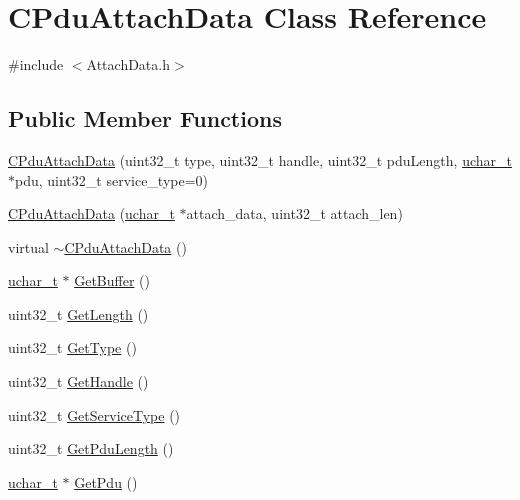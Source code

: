 \hypertarget{class_c_pdu_attach_data}{}\section{C\+Pdu\+Attach\+Data Class Reference}
\label{class_c_pdu_attach_data}


{\ttfamily \#include $<$Attach\+Data.\+h$>$}

\subsection*{Public Member Functions}
\begin{DoxyCompactItemize}
\item 
\hyperlink{class_c_pdu_attach_data_ac0d9f1f47428ea25ae2fa0c55fcaba62}{C\+Pdu\+Attach\+Data} (uint32\+\_\+t type, uint32\+\_\+t handle, uint32\+\_\+t pdu\+Length, \hyperlink{base_2ostype_8h_a124ea0f8f4a23a0a286b5582137f0b8d}{uchar\+\_\+t} $\ast$pdu, uint32\+\_\+t service\+\_\+type=0)
\item 
\hyperlink{class_c_pdu_attach_data_a13c9b8b7c6542e5d273caa314b8c666a}{C\+Pdu\+Attach\+Data} (\hyperlink{base_2ostype_8h_a124ea0f8f4a23a0a286b5582137f0b8d}{uchar\+\_\+t} $\ast$attach\+\_\+data, uint32\+\_\+t attach\+\_\+len)
\item 
virtual \hyperlink{class_c_pdu_attach_data_a82129edb810401d6cf26b0f659107df9}{$\sim$\+C\+Pdu\+Attach\+Data} ()
\item 
\hyperlink{base_2ostype_8h_a124ea0f8f4a23a0a286b5582137f0b8d}{uchar\+\_\+t} $\ast$ \hyperlink{class_c_pdu_attach_data_a72f79a0727e11c2cb116a2fc80e9c1d1}{Get\+Buffer} ()
\item 
uint32\+\_\+t \hyperlink{class_c_pdu_attach_data_aefbdcd0d932fc2b55ed4ebcfc1b2bf60}{Get\+Length} ()
\item 
uint32\+\_\+t \hyperlink{class_c_pdu_attach_data_a093fd1119581d46bdd41d7f76848fe58}{Get\+Type} ()
\item 
uint32\+\_\+t \hyperlink{class_c_pdu_attach_data_a94bee2411a1446bcde0aee1b550bc136}{Get\+Handle} ()
\item 
uint32\+\_\+t \hyperlink{class_c_pdu_attach_data_ad893757a4c8e180b312b4dfad12704e6}{Get\+Service\+Type} ()
\item 
uint32\+\_\+t \hyperlink{class_c_pdu_attach_data_a0246f70db45e64d2a2021ff944328d1a}{Get\+Pdu\+Length} ()
\item 
\hyperlink{base_2ostype_8h_a124ea0f8f4a23a0a286b5582137f0b8d}{uchar\+\_\+t} $\ast$ \hyperlink{class_c_pdu_attach_data_a09a77bee52d0dba9c53d74da358157ef}{Get\+Pdu} ()
\end{DoxyCompactItemize}

